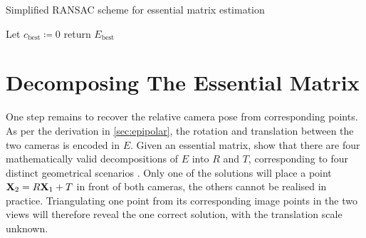    \SetAlCapSkip{1ex}
\begin{algorithm}
   \caption{Simplified RANSAC scheme for essential matrix estimation}
   \label{alg:ransac}
   Let $c_{\text{best}} \coloneqq 0$\;
   return $E_{\text{best}}$
\end{algorithm}

\section{Decomposing The Essential Matrix}

One step remains to recover the relative camera pose from corresponding points.
As per the derivation in \autoref{sec:epipolar}, the rotation and translation
between the two cameras is encoded in $E$. Given an essential matrix,
\citet[ch. 9.6]{h&z2004} show that there are four mathematically valid
decompositions of $E$ into $R$ and $T$, corresponding to four distinct
geometrical scenarios \citep[see][ch. 9.6]{h&z2004}. Only one of the
solutions will place a point $\mathbf{X}_2 = R\mathbf{X}_1 + T$ in front of both
cameras, the others cannot be realised in practice.  Triangulating one point
from its corresponding image points in the two views will therefore reveal the
one correct solution, with the translation scale unknown.
